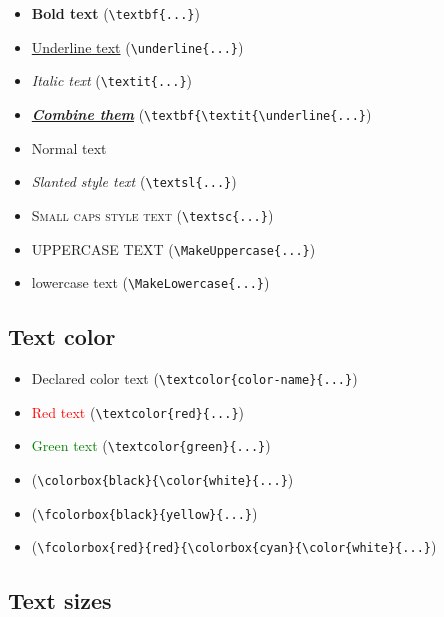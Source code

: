 \documentclass{article}				%
\begin{document}
\begin{itemize}
	\item \textbf{Bold text} (\verb|\textbf{...}|)
	\item \underline{Underline text} (\verb|\underline{...}|)
	\item \textit{Italic text} (\verb|\textit{...}|)
	\item \textbf{\textit{\underline{Combine them}}} (\verb|\textbf{\textit{\underline{...}|)
	\item Normal text
	\item \textsl{Slanted style text} (\verb|\textsl{...}|)
	\item \textsc{Small caps style text} (\verb|\textsc{...}|)
	\item \MakeUppercase{uppeRcase text} (\verb|\MakeUppercase{...}|)
	\item \MakeLowercase{LOWERcASE tExT} (\verb|\MakeLowercase{...}|)
\end{itemize}

\subsection{Text color}

\begin{itemize}
	\item \textcolor{color-name}{Declared color text} (\verb|\textcolor{color-name}{...}|)
	\item \textcolor{red}{Red text} (\verb|\textcolor{red}{...}|)
	\item \textcolor{green}{Green text} (\verb|\textcolor{green}{...}|)
	\item \colorbox{black}{\color{white}{White text on black}} (\verb|\colorbox{black}{\color{white}{...}|)
	\item {} (\verb|\fcolorbox{black}{yellow}{...}|)
	\item {} (\verb|\fcolorbox{red}{red}{\colorbox{cyan}{\color{white}{...}|)
\end{itemize}

\subsection{Text sizes}
\end{document}
